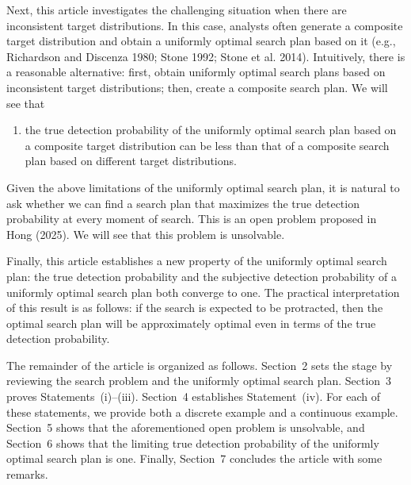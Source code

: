 \documentclass[12pt]{article}
\theoremstyle{plain}
\theoremstyle{definition}
\theoremstyle{remark}
\begin{document}
Next, this article investigates the challenging situation when there are inconsistent target distributions.  In this case, analysts often generate a composite target distribution and obtain a uniformly optimal search plan based on it (e.g., Richardson and Discenza 1980; Stone 1992; Stone et al. 2014).   Intuitively, there is a reasonable alternative: first, obtain uniformly optimal search plans based on inconsistent target distributions; then,  create a composite search plan.  We will see that
\begin{enumerate}
\item[(iv)]the true detection probability of the uniformly optimal search plan based on a composite target distribution can be less than that of a composite search plan based on different target distributions.
\end{enumerate}

Given the above limitations of the uniformly optimal search plan, it is natural to ask whether we can find a search plan that maximizes the true detection probability at every moment of search.  This is an open problem proposed in Hong (2025).  We will see that this problem is unsolvable.  

Finally, this article establishes a new property of the uniformly optimal search plan: the true detection probability and the subjective detection probability of a uniformly optimal search plan both converge to one.  The practical interpretation of this result is as follows: if the search is expected to be protracted, then the optimal search plan will be approximately optimal even in terms of the true detection probability.

The remainder of the article is organized as follows.  Section~2 sets the stage by reviewing the search problem and the uniformly optimal search plan.  Section~3 proves Statements~(i)--(iii).  Section~4 establishes Statement~(iv). For each of these statements,  we provide both a discrete example and a continuous example.  Section~5 shows that the aforementioned open problem is unsolvable, and Section~6 shows that the limiting true detection probability of the uniformly optimal search plan is one.  Finally,  Section~7 concludes the article with some remarks.


%
\end{document}
